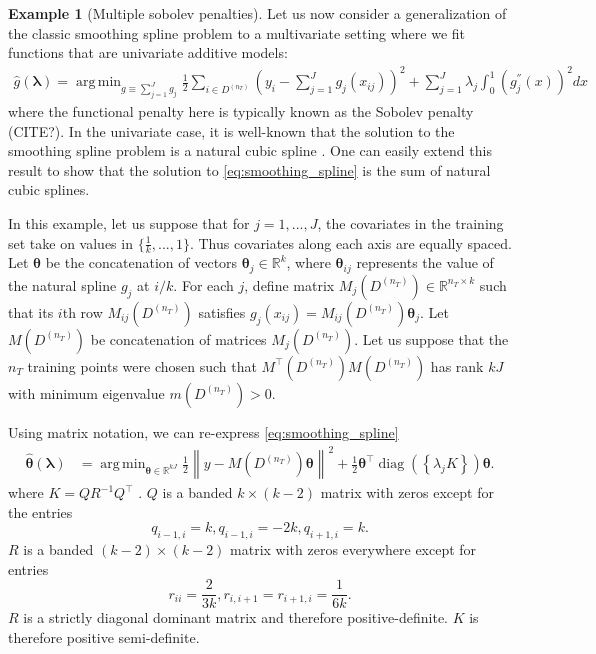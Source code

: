 \documentclass[12pt]{article} %
\theoremstyle{definition}
\newtheorem{example}{Example}
\DeclareMathOperator{\diag}{diag}
\DeclareMathOperator*{\argmin}{arg\,min}
\begin{document}
\begin{example}[Multiple sobolev penalties]
	Let us now consider a generalization of the classic smoothing spline problem to a multivariate setting where we fit functions that are univariate additive models:
	\begin{align}
	\hat{g}(\boldsymbol{\lambda})
	= \argmin_{g \equiv \sum_{j=1}^J g_j}
	\frac{1}{2} \sum_{i\in D^{(n_T)}}
	\left(
	y_i - \sum_{j=1}^J g_j(x_{ij})
	\right)^2
	+ \sum_{j=1}^{J} \lambda_j \int_0^1 \left(g_j^{''}(x)\right)^{2} dx
	\label{eq:smoothing_spline}
	\end{align}
	where the functional penalty here is typically known as the Sobolev penalty (CITE?).
	In the univariate case, it is well-known that the solution to the smoothing spline problem is a natural cubic spline \citep{green1993nonparametric}.
	One can easily extend this result to show that the solution to \eqref{eq:smoothing_spline} is the sum of natural cubic splines.
	
	In this example, let us suppose that for $j = 1,...,J$, the covariates in the training set take on values in $\{\frac{1}{k}, ..., 1\}$.
	Thus covariates along each axis are equally spaced.
	Let $\boldsymbol{\theta}$ be the concatenation of vectors $\boldsymbol{\theta}_j \in \mathbb{R}^{k}$, where $\boldsymbol{\theta}_{ij}$ represents the value of the natural spline $g_j$ at $i/k$.
	For each $j$, define matrix $M_{j}(D^{(n_T)}) \in \mathbb{R}^{n_T \times k}$ such that its $i$th row $M_{ij}(D^{(n_T)})$ satisfies $g_j(x_{ij}) = M_{ij}(D^{(n_T)}) \boldsymbol{\theta}_j$.
	Let $M(D^{(n_T)})$ be concatenation of matrices $M_{j}(D^{(n_T)})$.
	Let us suppose that the $n_T$ training points were chosen such that $M^\top(D^{(n_T)})M(D^{(n_T)})$ has rank $kJ$ with minimum eigenvalue $m(D^{(n_T)}) >0$.
	
	Using matrix notation, we can re-express \eqref{eq:smoothing_spline}
	\begin{align}
	\hat{\boldsymbol{\theta}}(\boldsymbol{\lambda})
	& = \argmin_{\boldsymbol{\theta} \in \mathbb{R}^{kJ}}
	\frac{1}{2}
	\left \|
	y - M(D^{(n_T)}) \boldsymbol{\theta}
	\right \|^2
	+
	\frac{1}{2}
	\boldsymbol{\theta}^\top
	\diag \left (
	\left \{
	\lambda_j K
	\right \} \right ) \boldsymbol{\theta}.
	\label{eq:matrix_sobolev}
	\end{align}
	where $K = QR^{-1}Q^\top$ \citep{green1993nonparametric}.
	$Q$ is a banded $k \times (k-2)$ matrix with zeros except for the entries
	$$
	q_{i-1,i} = k, q_{i-1,i} = -2k, q_{i + 1,i} = k.
	$$
	$R$ is a banded $(k-2) \times (k-2)$ matrix with zeros everywhere except for entries
	$$
	r_{ii} = \frac{2}{3k}, r_{i, i+ 1} = r_{i+ 1, i} = \frac{1}{6k}.
	$$
	$R$ is a strictly diagonal dominant matrix and therefore positive-definite.
	$K$ is therefore positive semi-definite.


\end{example}
\end{document}
